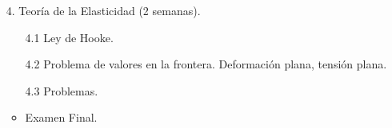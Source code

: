 \begin{itemize}
\begin{itemize}
		\item[4.] Teoría de la Elasticidad (2 semanas).
		\begin{itemize}
		\item[4.1] Ley de Hooke.
		\item[4.2] Problema de valores en la frontera. Deformación plana, tensión plana.
		\item[4.3] Problemas.
		\item Examen Final.
		\end{itemize}
	\end{itemize}
\end{itemize}



